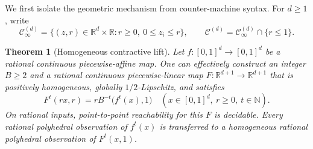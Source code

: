 \documentclass[11pt,letterpaper]{article}
\numberwithin{equation}{section}
\newtheorem{theorem}{Theorem}[section]
\theoremstyle{definition}
\theoremstyle{remark}
\newcommand{\N}{\mathbb N}
\newcommand{\R}{\mathbb R}
\newcommand{\Cone}{\mathcal C}
\newcommand{\Cinf}{\mathcal C_{\infty}}
\begin{document}
We first isolate the geometric mechanism from counter-machine syntax.
For $d\ge1$, write
\[
\Cinf^{(d)}=\{(z,r)\in\R^d\times\R: r\ge0,\ 0\le z_i\le r\},
\qquad
\Cone^{(d)}=\Cinf^{(d)}\cap\{r\le1\}.
\]

\begin{theorem}[Homogeneous contractive lift]\label{pqc:sc:thm:lift}
Let $f:[0,1]^d\to[0,1]^d$ be a rational continuous piecewise-affine map.
One can effectively construct an integer $B\ge2$ and a rational continuous
piecewise-linear map $F:\R^{d+1}\to\R^{d+1}$ that is positively homogeneous,
globally $1/2$-Lipschitz, and satisfies
\begin{equation}\label{pqc:sc:eq:general-simulation}
 F^t(rx,r)=rB^{-t}\bigl(f^t(x),1\bigr)
 \quad(x\in[0,1]^d,\ r\ge0,\ t\in\N).
\end{equation}
On rational inputs, point-to-point reachability for this $F$ is decidable.
Every rational polyhedral observation of $f^t(x)$ is transferred to a
homogeneous rational polyhedral observation of $F^t(x,1)$.
\end{theorem}
\end{document}
